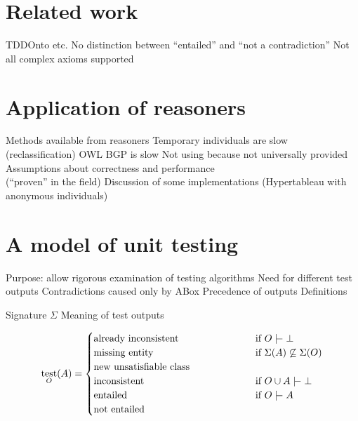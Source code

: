 \documentclass[draft]{sig-alternate}
\newcommand{\union}{\cup}
\newcommand{\sementails}{\mathrel{|}\joinrel\mkern-.5mu\mathrel{-}}
\newcommand{\signature}{\Sigma}
\DeclareMathOperator{\test}{test}
\newcommand{\casesbox}[2][.45\linewidth]{\parbox[t]{#1}{\hangindent=1em\relax#2}}
\let\oldtextproc\textproc
\renewcommand{\textproc}[1]{\nohyphens{\oldtextproc{#1}}}
\begin{document}
\section{Related work}
\label{sec:related}

\begin{todos}
  \todo TDDOnto etc.
  \todo No distinction between ``entailed'' and ``not a contradiction''
  \todo Not all complex axioms supported
\end{todos}

\section{Application of reasoners}
\label{sec:reasoners}

\begin{todos}
  \todo Methods available from reasoners
  \todo Temporary individuals are slow (reclassification)
  \todo OWL BGP is slow
  \todo Not using  because not universally provided
  \todo Assumptions about correctness and performance \\(``proven'' in the field)
  \todo Discussion of some implementations (Hypertableau with anonymous individuals)
\end{todos}

\section{A model of unit testing}
\label{sec:model}

\begin{todos}
  \todo Purpose: allow rigorous examination of testing algorithms
  \todo Need for different test outputs
  \todo Contradictions caused only by ABox
  \todo Precedence of outputs
  \todo Definitions
  \begin{todos}
    \todo Signature $\signature$
    \todo Meaning of test outputs
  \end{todos}
\end{todos}

\begin{description}
  \item[]
\end{description}

\[
  \test_O(A) =
  \begin{cases}
    \casesbox{already inconsistent} &
      \text{if } O \sementails \bot \\
    \casesbox{missing entity} &
      \text{if } \signature(A) \not\subseteq \signature(O) \\
    \casesbox{new unsatisfiable class} & \\
    \casesbox{inconsistent} &
      \text{if } O \union A \sementails \bot \\
    \casesbox{entailed} &
      \text{if } O \sementails A \\
    \casesbox{not entailed} & \\
  \end{cases}
\]
\end{document}
